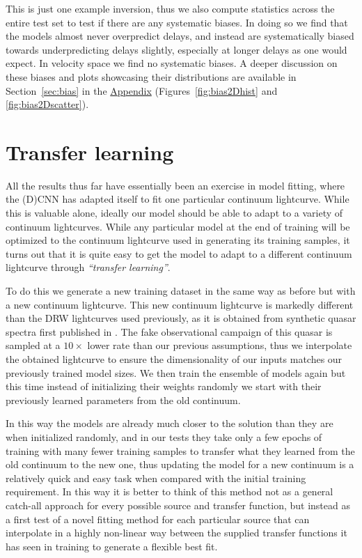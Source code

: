 \documentclass[floatfix,twocolumn,trackchanges,linenumbers]{aastex7}
\begin{document}
This is just one example inversion, thus we also compute statistics across the entire test set to test if there are any systematic biases. In doing so we find that the
models almost never overpredict delays, and instead are systematically biased towards underpredicting delays slightly, especially at longer delays as one would expect.
In velocity space we find no systematic biases. A deeper discussion on these biases and plots showcasing their distributions are available in Section~\ref{sec:bias} in the \hyperref[appendix]{Appendix} (Figures~\ref{fig:bias2Dhist} and \ref{fig:bias2Dscatter}).

\section{Transfer learning}\label{sec:transfer}

All the results thus far have essentially been an exercise in model fitting, where the (D)CNN has adapted itself to fit one particular continuum lightcurve. While this is valuable alone, ideally our model should be able to adapt to a variety of continuum lightcurves. While any particular model at the end of training will be optimized to the continuum lightcurve used in generating its training samples, it turns out that it is quite easy to get the model to adapt to a different continuum lightcurve through \textit{``transfer learning''}. 

To do this we generate a new training dataset in the same way as before but with a new continuum lightcurve. This new continuum lightcurve is markedly different than the DRW lightcurves used previously, as it is obtained from synthetic quasar spectra first published in \cite{Mangham2019}. The fake observational campaign of this quasar is sampled at a $10\times$ lower rate than our previous assumptions, thus we interpolate the obtained lightcurve to ensure the dimensionality of our inputs matches our previously trained model sizes. We then train the ensemble of models again but this time instead of initializing their weights randomly we start with their previously learned parameters from the old continuum.

In this way the models are already much closer to the solution than they are when initialized randomly, and in our tests they take only a few epochs of training with many fewer training samples to transfer what they learned from the old continuum to the new one, thus updating the model for a new continuum is a relatively quick and easy task when compared with the initial training requirement. In this way it is better to think of this method not as a general catch-all approach for every possible source and transfer function, but instead as a first test of a novel fitting method for each particular source that can interpolate in a highly non-linear way between the supplied transfer functions it has seen in training to generate a flexible best fit. 
\end{document}
